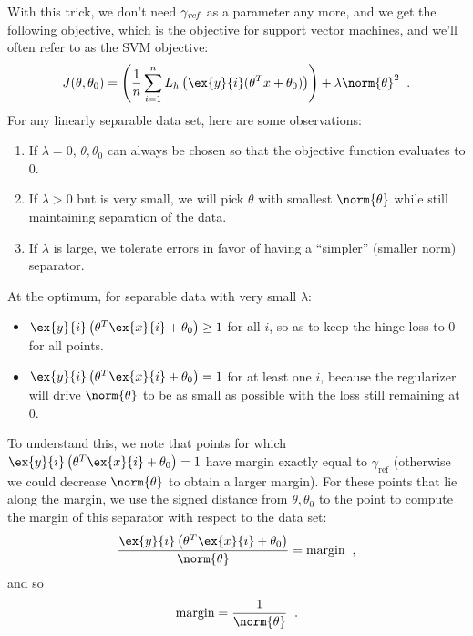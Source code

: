 With this trick, we don't need $\gamma_{\it ref}$ as a parameter any
more, and we get the following objective, which is the objective
  for support vector machines, and we'll often refer to as the 
SVM objective:
\[ J(\theta,\theta_0) = \left(\frac{1}{n}\sum_{i=1}^n L_h\left(\ex{y}{i}
(\theta^Tx+\theta_0)\right)\right) + \lambda\norm{\theta}^2 \;\;.\]
For any linearly separable data set, here are some observations:
\begin{enumerate}
  \item If $\lambda = 0$, $\theta, \theta_0$ can always
    be chosen so that the objective function evaluates to 0.
  \item If $\lambda > 0$ but is very small, we will pick $\theta$
    with smallest $\norm{\theta}$ while still maintaining separation
    of the data.
  \item If $\lambda$ is large, we tolerate errors in favor of having a
    ``simpler'' (smaller norm) separator.
\end{enumerate}

At the optimum, for separable data with very small $\lambda$:
\begin{itemize}
  \item $\ex{y}{i}\left(\theta^T\ex{x}{i} + \theta_0\right) \geq 1$ for
  all $i$, so as to keep the hinge loss to 0 for all points.
  \item $\ex{y}{i}\left(\theta^T\ex{x}{i} + \theta_0\right) = 1$ for
  at least one $i$, because the regularizer will drive $\norm{\theta}$ to be
  as small as possible with the loss still remaining at 0. 
\end{itemize}
To understand this, we note that
points for which $\ex{y}{i}\left(\theta^T\ex{x}{i} + \theta_0\right) = 1$
have margin exactly equal to $\gamma_\text{ref}$ (otherwise we could decrease
  $\norm{\theta}$ to obtain a larger margin). For these points that lie
  along the margin, we use the signed distance from $\theta,\theta_0$ to the point to
  compute the margin of this separator with respect to the data set:
  \[ \frac{\ex{y}{i}\left(\theta^T\ex{x}{i}+\theta_0\right)}
    {\norm{\theta}} = \text{margin}\;\;,\]
and so 
 \[\text{margin} =\frac{1}{\norm{\theta}} \;\;.\]



